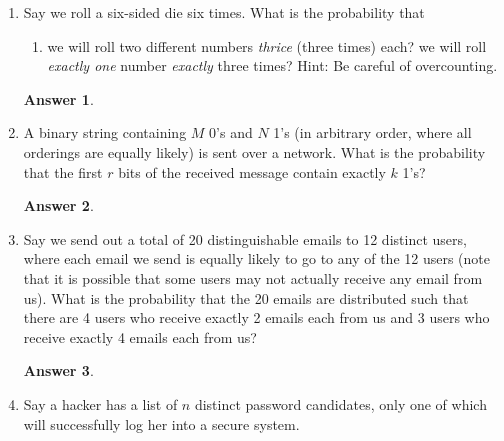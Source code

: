 \documentclass[12pt]{article}
\renewcommand{\(}{\left(}
\renewcommand{\)}{\right)}
\theoremstyle{definition}
\newtheorem*{answer}{Answer}
\begin{document}
\begin{enumerate}
\item Say we roll a six-sided die six times. What is the probability that
    \begin{enumerate}[label=\alph*.]
    \item we will roll two different numbers \textit{thrice} (three times) each?
    we will roll \textit{exactly one} number \textit{exactly} three times? Hint: Be careful of overcounting.
    \end{enumerate}

    \begin{shaded}
    \begin{answer}

    \end{answer}
    \end{shaded}
    \newpage


\item A binary string containing $M$  0's and $N$  1's (in arbitrary order, where all orderings are equally likely) is sent over a network.  What is the probability that the first $r$ bits of the received message contain exactly $k$  1's?

    \begin{shaded}
    \begin{answer}

    \end{answer}
    \end{shaded}
    \newpage


\item Say we send out a total of 20 distinguishable emails to 12 distinct users, where each email we send is equally likely to go to any of the 12 users (note that it is possible that some users may not actually receive any email from us).  What is the probability that the 20 emails are distributed such that there are 4 users who receive exactly 2 emails each from us and 3 users who receive exactly 4 emails each from us?

    \begin{shaded}
    \begin{answer}

    \end{answer}
    \end{shaded}
    \newpage


\item Say a hacker has a list of $n$ distinct password candidates, only one of which will successfully log her into a secure system.
    \begin{enumerate}[label=\alph*.]


\end{enumerate}
\end{enumerate}
\end{document}
